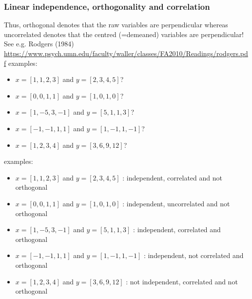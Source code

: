 \documentclass{beamer}
\begin{document}
\begin{frame}
\frametitle{Linear independence, orthogonality and correlation}
Thus, orthogonal denotes that the raw variables are perpendicular whereas uncorrelated denotes that the centred (=demeaned) variables are perpendicular! See e.g. Rodgers (1984) 
\url{https://www.psych.umn.edu/faculty/waller/classes/FA2010/Readings/rodgers.pdf}
examples:
\begin{itemize} 
\item $x = [1,1,2,3]$ and $y = [2,3,4,5]$?
\item $x = [0,0,1,1]$ and $y = [1,0,1,0]$?
\item $x = [1,-5,3, -1]$ and $y = [5,1,1,3]$?
\item $x = [-1,-1,1,1]$ and $y = [1,-1,1,-1]$?
\item $x = [1,2,3,4]$ and $y = [3,6,9,12]$?
\end{itemize}
\end{frame}

\begin{frame}
examples:
\begin{itemize} 
\item $x = [1,1,2,3]$ and $y = [2,3,4,5]$ :  independent, correlated and not orthogonal
\item $x = [0,0,1,1]$ and $y = [1,0,1,0]$ : independent, uncorrelated and not orthogonal
\item $x = [1,-5,3, -1]$ and $y = [5,1,1,3]$  : independent, correlated and orthogonal
\item $x = [-1,-1,1,1]$ and $y = [1,-1,1,-1]$ : independent, not correlated and orthogonal
\item $x = [1,2,3,4]$ and $y = [3,6,9,12]$ : not independent, correlated and not orthogonal
\end{itemize}
\end{frame}
\end{document}
